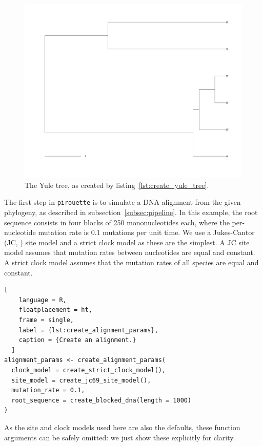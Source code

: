 \begin{figure}[ht]
  \includegraphics[width=\textwidth]{example_1/true_tree.png}
  \caption{The Yule tree, as created by listing~\ref{lst:create_yule_tree}.}
  \label{fig:yule_tree}
\end{figure}

The first step in \verb;pirouette; is to simulate a DNA alignment from the 
given phylogeny, as described in subsection~\ref{subsec:pipeline}.
In this example, the root sequence consists in four blocks of 250 
mononucleotides each, 
where the per-nucleotide mutation rate is 0.1 mutations per unit time.
We use a Jukes-Cantor (JC, \cite{jukes1969evolution}) site model
and a strict clock model as these are the simplest.
A JC site model assumes that mutation rates between nucleotides are equal and constant. 
A strict clock model assumes that the mutation rates 
of all species are equal and constant.

\begin{lstlisting}[
    language = R,
    floatplacement = ht,
    frame = single,
    label = {lst:create_alignment_params}, 
    caption = {Create an alignment.}
  ]
alignment_params <- create_alignment_params(
  clock_model = create_strict_clock_model(),
  site_model = create_jc69_site_model(),
  mutation_rate = 0.1,
  root_sequence = create_blocked_dna(length = 1000)
)
\end{lstlisting}

As the site and clock models used here are also the defaults, 
these function arguments can be safely omitted: we just show these
explicitly for clarity.

